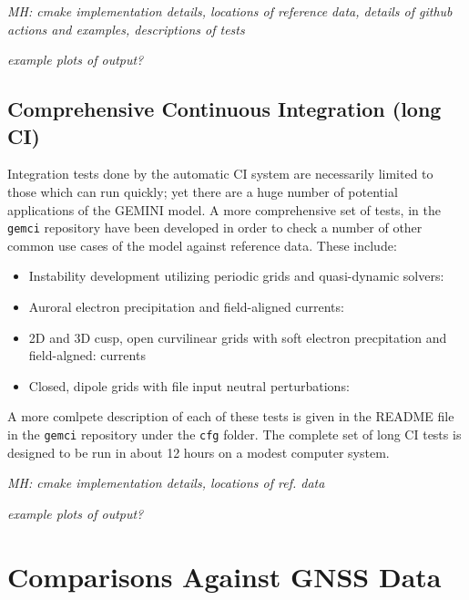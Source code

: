 \documentclass[11pt,letterpaper]{article}
\begin{document}
\emph{MH:  cmake implementation details, locations of reference data, details of github actions and examples, descriptions of tests}

\emph{example plots of output?}

\subsection{Comprehensive Continuous Integration (long CI)}

Integration tests done by the automatic CI system are necessarily limited to those which can run quickly; yet there are a huge number of potential applications of the GEMINI model.  A more comprehensive set of tests, in the \texttt{gemci} repository have been developed in order to check a number of other common use cases of the model against reference data.  These include:
\begin{itemize}
  \item Instability development utilizing periodic grids and quasi-dynamic solvers:  
  \item Auroral electron precipitation and field-aligned currents:  
  \item 2D and 3D cusp, open curvilinear grids with soft electron precpitation and field-algned:   currents
  \item Closed, dipole grids with file input neutral perturbations:  
\end{itemize}
A more comlpete description of each of these tests is given in the README file in the \texttt{gemci} repository under the \texttt{cfg} folder.  The complete set of long CI tests is designed to be run in about 12 hours on a modest computer system.  

\emph{MH:  cmake implementation details, locations of ref. data}

\emph{example plots of output?}



\section{Comparisons Against GNSS Data}



\pagebreak
\setcounter{page}{1}

%

\end{document}

